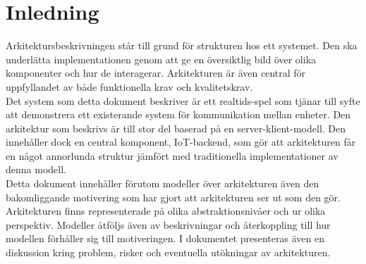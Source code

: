 \section{Inledning}
Arkitektursbeskrivningen står till grund för strukturen hos ett systemet. Den ska underlätta implementationen genom att ge en översiktlig bild över olika komponenter och hur de interagerar. Arkitekturen är även central för uppfyllandet av både funktionella krav och kvalitetskrav.\\

Det system som detta dokument beskriver är ett realtids-spel som tjänar till syfte att demonstrera ett existerande system för kommunikation mellan enheter. Den arkitektur som beskrivs är till stor del baserad på en server-klient-modell. Den innehåller dock en central komponent, IoT-backend, som gör att arkitekturen får en något annorlunda struktur jämfört med traditionella implementationer av denna modell.\\

Detta dokument innehåller förutom modeller över arkitekturen även den bakomliggande motivering som har gjort att arkitekturen ser ut som den gör. Arkitekturen finns representerade på olika abstraktionsnivåer och ur olika perspektiv. Modeller åtföljs även av beskrivningar och återkoppling till hur modellen förhåller sig till motiveringen. I dokumentet presenteras även en diskussion kring problem, risker och eventuella utökningar av arkitekturen.\\
